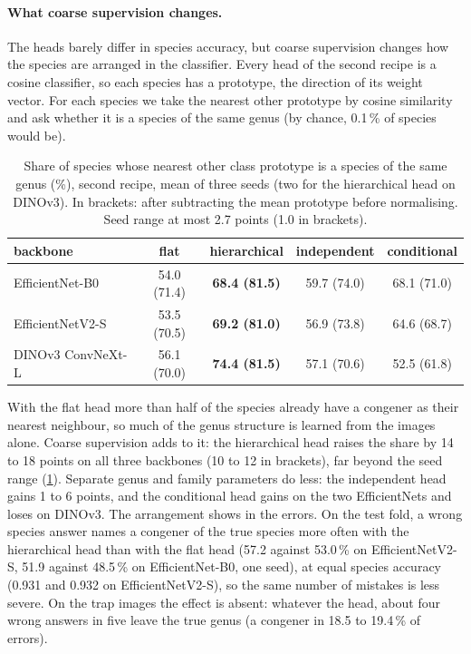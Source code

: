 \paragraph{What coarse supervision changes.}
The heads barely differ in species accuracy, but coarse supervision changes how the species are arranged in the classifier.
Every head of the second recipe is a cosine classifier, so each species has a prototype, the direction of its weight vector.
For each species we take the nearest other prototype by cosine similarity and ask whether it is a species of the same genus (by chance, 0.1\,\% of species would be).

\begin{table}[htb]
    \centering
    \caption{Share of species whose nearest other class prototype is a species of the same genus (\%), second recipe, mean of three seeds (two for the hierarchical head on DINOv3). In brackets: after subtracting the mean prototype before normalising. Seed range at most 2.7 points (1.0 in brackets).}
    \label{tab:heads_congeners}
    \begin{tabular}{lcccc}
        \toprule
        backbone & flat & hierarchical & independent & conditional \\
        \midrule
        EfficientNet-B0 & 54.0 (71.4) & \textbf{68.4 (81.5)} & 59.7 (74.0) & 68.1 (71.0) \\
        EfficientNetV2-S & 53.5 (70.5) & \textbf{69.2 (81.0)} & 56.9 (73.8) & 64.6 (68.7) \\
        DINOv3 ConvNeXt-L & 56.1 (70.0) & \textbf{74.4 (81.5)} & 57.1 (70.6) & 52.5 (61.8) \\
        \bottomrule
    \end{tabular}
\end{table}

With the flat head more than half of the species already have a congener as their nearest neighbour, so much of the genus structure is learned from the images alone.
Coarse supervision adds to it: the hierarchical head raises the share by 14 to 18 points on all three backbones (10 to 12 in brackets), far beyond the seed range (\cref{tab:heads_congeners}).
Separate genus and family parameters do less: the independent head gains 1 to 6 points, and the conditional head gains on the two EfficientNets and loses on DINOv3.
The arrangement shows in the errors.
On the test fold, a wrong species answer names a congener of the true species more often with the hierarchical head than with the flat head (57.2 against 53.0\,\% on EfficientNetV2-S, 51.9 against 48.5\,\% on EfficientNet-B0, one seed), at equal species accuracy (0.931 and 0.932 on EfficientNetV2-S), so the same number of mistakes is less severe.
On the trap images the effect is absent: whatever the head, about four wrong answers in five leave the true genus (a congener in 18.5 to 19.4\,\% of errors).
